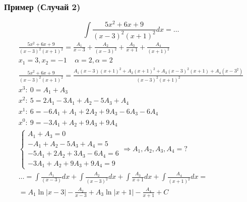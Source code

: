 \documentclass{article}
\begin{document}
\subsubsection{Пример (Случай 2)}
\[
    \int \frac{5x^2 + 6x + 9}{(x - 3)^2(x + 1)^2} dx = \dots
\]
\begin{gather*}
    \frac{5x^2 + 6x + 9}{(x - 3)^2(x + 1)^2} = 
    \frac{A_1}{x - 3} + \frac{A_2}{(x - 3)^2} + \frac{A_3}{x + 1} + \frac{A_4}{(x + 1)^2} \\
    x_1 = 3, x_2 = -1 ~~~~~ \alpha = 2, \alpha = 2 \\
    \frac{5x^2 + 6x + 9}{(x - 3)^2 (x + 1)^2} =
    \frac{A_1(x - 3)(x + 1)^2 + A_2(x + 1)^2 + A_3(x - 3)^2(x + 1) + A_4(x - 3^2)}{(x - 3)^2(x + 1)^2} \\
    x^3:~ 0 =   A_1               +  A_3               \\
    x^2:~ 5 =  2A_1 - 3A_1 +  A_2 - 5A_3        +  A_4 \\
    x^1:~ 6 = -6A_1 +  A_1 + 2A_2 + 9A_3 - 6A_3 - 6A_4 \\
    x^0:~ 9 = -3A_1        +  A_2 + 9A_3        + 9A_4 \\
    \begin{cases}
          A_1       +  A_3         = 0 \\
         -A_1 +  A_2 - 5A_3 +  A_4 = 5 \\
        -5A_1 + 2A_2 + 3A_3 - 6A_4 = 6 \\
        -3A_1 +  A_2 + 9A_3 + 9A_4 = 9
    \end{cases} \Rightarrow A_1, A_2, A_3, A_4 = ? \\
    \dots = \int \frac{A_1}{(x - 3)} dx + \int \frac{A_2}{(x - 3)^2} dx + \int \frac{A_3}{x + 1} dx + \int \frac{A_4}{(x + 1)^2} dx = \\
    = A_1 \ln |x - 3| - \frac{A_2}{x - 3} + A_3 \ln |x + 1| - \frac{A_4}{x + 1} + C
\end{gather*}
\end{document}
